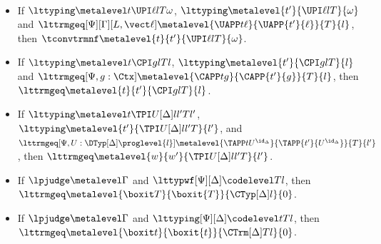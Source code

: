 \begin{law}[Congruence] $ $
  \begin{itemize}
  \item If $\lttyping \metalevel t {\UPI \ell l T}{\omega}$, $\lttyping \metalevel {t'}{\UPI \ell l
      T}{\omega}$ and $\lttrmgeq[\Psi][\Gamma][L, \vect\ell] \metalevel{\UAPP
      t{\ell}}{\UAPP{t'}{\ell}}{T}{l}$, then
    $\tconvtrmnf \metalevel{t}{t'}{\UPI \ell l T}{\omega}$. 
  \item If $\lttyping \metalevel t{\CPI g l T}{l}$, $\lttyping \metalevel {t'}{\CPI g l T}{l}$ and \newline
    $\lttrmgeq[\Psi, g : \Ctx] \metalevel{\CAPP t{g}}{\CAPP{t'}{g}}{T}{l}$, then $\lttrmgeq
    \metalevel{t}{t'}{\CPI g l T}{l}$. 
  \item If $\lttyping \metalevel t {\TPI U [\Delta]{l}{l'} T}{l'}$,
    $\lttyping \metalevel {t'}{\TPI U [\Delta]{l}{l'} T}{l'}$, and \newline
    $\lttrmgeq[\Psi, U : \DTyp[\Delta] \proglevel{l}] \metalevel{\TAPP
      t{U^{\id_\Delta}}}{\TAPP{t'}{U^{\id_\Delta}}}{T}{l'}$, then \newline
    $\lttrmgeq \metalevel{w}{w'}{\TPI U [\Delta]{l}{l'} T}{l'}$.
  \item If $\lpjudge \metalevel \Gamma$ and $\lttypwf[\Psi][\Delta] \codelevel T l$, then $\lttrmgeq
    \metalevel{\boxit T}{\boxit{T}}{\CTyp[\Delta] l}{0}$.
  \item If $\lpjudge \metalevel \Gamma$ and $\lttyping[\Psi][\Delta] \codelevel t T l$, then
    $\lttrmgeq \metalevel{\boxit t}{\boxit{t}}{\CTrm[\Delta] T l}{0}$. 
  \end{itemize}
\end{law}


